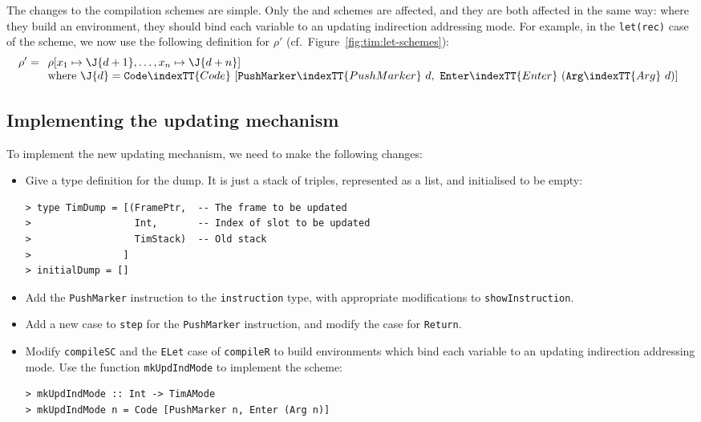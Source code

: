 The changes to the compilation schemes
are simple.  Only the \tSC{} and \tR{} schemes are affected,
and they are both affected in the same way:
where they build an environment, they should bind each variable
to an updating indirection addressing mode.  For example, in the
\mbox{\tt let(rec)} case of the \tR{} scheme, we now use the following definition
for $\rho'$ (cf.\ Figure~\ref{fig:tim:let-schemes}):
\[
\rho' =
\begin{array}[t]{l}
\rho[x_1 \mapsto \J{d+1}, \ldots, x_n \mapsto \J{d+n}] \\
\mbox{where}~ \J{d} = \mbox{\tt Code}\indexTT{Code}~[\mbox{\tt PushMarker}\indexTT{PushMarker}~d,~\mbox{\tt Enter}\indexTT{Enter}~(\mbox{\tt Arg}\indexTT{Arg}~d)]
\end{array}
\]

\subsection{Implementing the updating mechanism}

To implement the new updating mechanism, we need to make the following changes:
\begin{itemize}
\item
Give a type definition for the dump.  It is just a stack of
triples, represented as a list, and initialised to be empty:
\begin{verbatim}
> type TimDump = [(FramePtr,  -- The frame to be updated
>                  Int,       -- Index of slot to be updated
>                  TimStack)  -- Old stack
>                ]
> initialDump = []
\end{verbatim}
%
%
\item
Add the \mbox{\tt PushMarker} instruction to the \mbox{\tt instruction} type, with appropriate
modifications to \mbox{\tt showInstruction}.
\item
Add a new case to \mbox{\tt step} for the \mbox{\tt PushMarker} instruction, and modify the
case for \mbox{\tt Return}.
\item
Modify \mbox{\tt compileSC} and the \mbox{\tt ELet} case of \mbox{\tt compileR}
to build environments which bind each variable to an updating
indirection addressing mode.
Use the function \mbox{\tt mkUpdIndMode} to implement the \tJ{} scheme:
\begin{verbatim}
> mkUpdIndMode :: Int -> TimAMode
> mkUpdIndMode n = Code [PushMarker n, Enter (Arg n)]
\end{verbatim}
%
%
\end{itemize}

